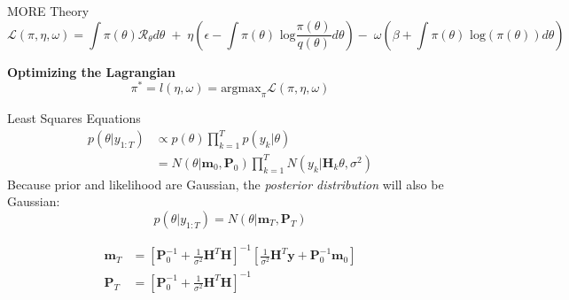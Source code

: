 \documentclass[navbarinfooter, 12pt]{sdqbeamer}
\begin{document}
\begin{frame}{MORE Theory}
$$ \mathcal{L}(\pi, \eta, \omega) = 
\int \pi(\theta) \mathcal{R}_{\theta} d\theta \; + \; 
\eta  \left(\epsilon - \int \pi(\theta) \text{ log}
 \frac{\pi(\theta)}{q(\theta)} d\theta\right)
 - \; \omega \left(\beta + \int \pi(\theta) \text{ log}(\pi(\theta)) d\theta\right)
$$

\textbf{Optimizing the Lagrangian}
$$ \pi^* = l(\eta,\omega) = \text{argmax}_{\pi} 
\mathcal{L}(\pi, \eta, \omega) $$

\end{frame}

\begin{frame}{Least Squares Equations}
    \begin{align*}
      p(\theta | y_{1:T}) &\propto p(\theta) \prod^T_{k=1} p(y_k|\theta)  \\
                          &= N(\theta | \textbf{m}_0, \textbf{P}_0)
                            \prod^T_{k=1} N(y_k | \textbf{H}_k \theta, \sigma^2)
    \end{align*}
    Because prior and likelihood are Gaussian, the \textit{posterior distribution} will
    also be Gaussian:
    $$ p(\theta | y_{1:T}) = N(\theta | \textbf{m}_T, \textbf{P}_T) $$
    
    \begin{align*}
      \textbf{m}_T &= [\textbf{P}_0^{-1} + \frac{1}{\sigma^2} \textbf{H}^T \textbf{H}]^{-1}
                     [\frac{1}{\sigma^2} \textbf{H}^T \textbf{y} + \textbf{P}_0^{-1} \textbf{m}_0] \\
      \textbf{P}_T &= [\textbf{P}_0^{-1} + \frac{1}{\sigma^2} \textbf{H}^T \textbf{H}]^{-1}
    \end{align*}

\end{frame}

\backupend
\end{document}
